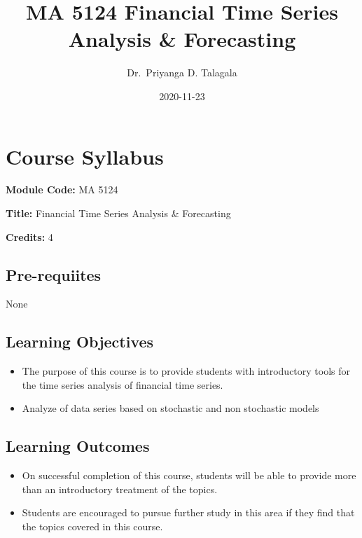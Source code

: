 \documentclass[]{book}
\title{MA 5124 Financial Time Series Analysis \& Forecasting}
\author{Dr.~Priyanga D. Talagala}
\date{2020-11-23}
\providecommand{\tightlist}{%
  \setlength{\itemsep}{0pt}\setlength{\parskip}{0pt}}
\begin{document}
\maketitle

{
\setcounter{tocdepth}{1}
\tableofcontents
}
\hypertarget{course-syllabus}{%
\chapter*{Course Syllabus}\label{course-syllabus}}


\textbf{Module Code:} MA 5124

\textbf{Title:} Financial Time Series Analysis \& Forecasting

\textbf{Credits:} 4

\hypertarget{pre-requiites}{%
\section*{Pre-requiites}\label{pre-requiites}}

None

\hypertarget{learning-objectives}{%
\section*{Learning Objectives}\label{learning-objectives}}

\begin{itemize}
\tightlist
\item
  The purpose of this course is to provide students with introductory tools for the time series analysis of financial time series.
\item
  Analyze of data series based on stochastic and non stochastic models
\end{itemize}

\hypertarget{learning-outcomes}{%
\section*{Learning Outcomes}\label{learning-outcomes}}

\begin{itemize}
\tightlist
\item
  On successful completion of this course, students will be able to provide more than an introductory treatment of the topics.
\item
  Students are encouraged to pursue further study in this area if they find that the topics covered in this course.
\end{itemize}
\end{document}
